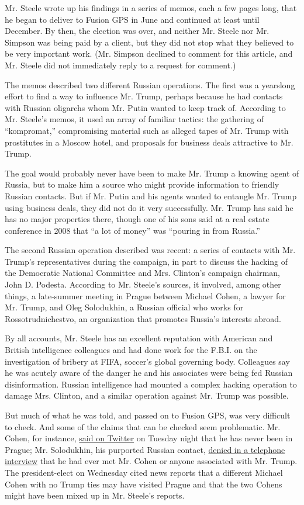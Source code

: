 Mr. Steele wrote up his findings in a series of memos, each a few pages
long, that he began to deliver to Fusion GPS in June and continued at
least until December. By then, the election was over, and neither Mr.
Steele nor Mr. Simpson was being paid by a client, but they did not stop
what they believed to be very important work. (Mr. Simpson declined to
comment for this article, and Mr. Steele did not immediately reply to a
request for comment.)

The memos described two different Russian operations. The first was a
yearslong effort to find a way to influence Mr. Trump, perhaps because
he had contacts with Russian oligarchs whom Mr. Putin wanted to keep
track of. According to Mr. Steele's memos, it used an array of familiar
tactics: the gathering of ``kompromat,'' compromising material such as
alleged tapes of Mr. Trump with prostitutes in a Moscow hotel, and
proposals for business deals attractive to Mr. Trump.

The goal would probably never have been to make Mr. Trump a knowing
agent of Russia, but to make him a source who might provide information
to friendly Russian contacts. But if Mr. Putin and his agents wanted to
entangle Mr. Trump using business deals, they did not do it very
successfully. Mr. Trump has said he has no major properties there,
though one of his sons said at a real estate conference in 2008 that ``a
lot of money'' was ``pouring in from Russia.''

The second Russian operation described was recent: a series of contacts
with Mr. Trump's representatives during the campaign, in part to discuss
the hacking of the Democratic National Committee and Mrs. Clinton's
campaign chairman, John D. Podesta. According to Mr. Steele's sources,
it involved, among other things, a late-summer meeting in Prague between
Michael Cohen, a lawyer for Mr. Trump, and Oleg Solodukhin, a Russian
official who works for Rossotrudnichestvo, an organization that promotes
Russia's interests abroad.

By all accounts, Mr. Steele has an excellent reputation with American
and British intelligence colleagues and had done work for the F.B.I. on
the investigation of bribery at FIFA, soccer's global governing body.
Colleagues say he was acutely aware of the danger he and his associates
were being fed Russian disinformation. Russian intelligence had mounted
a complex hacking operation to damage Mrs. Clinton, and a similar
operation against Mr. Trump was possible.

But much of what he was told, and passed on to Fusion GPS, was very
difficult to check. And some of the claims that can be checked seem
problematic. Mr. Cohen, for instance,
\href{https://twitter.com/MichaelCohen212/status/818991277685567489}{said
on Twitter} on Tuesday night that he has never been in Prague; Mr.
Solodukhin, his purported Russian contact,
\href{https://www.nytimes.com/2017/01/10/us/politics/donald-trump-russia-intelligence.html}{denied
in a telephone interview} that he had ever met Mr. Cohen or anyone
associated with Mr. Trump. The president-elect on Wednesday cited news
reports that a different Michael Cohen with no Trump ties may have
visited Prague and that the two Cohens might have been mixed up in Mr.
Steele's reports.

